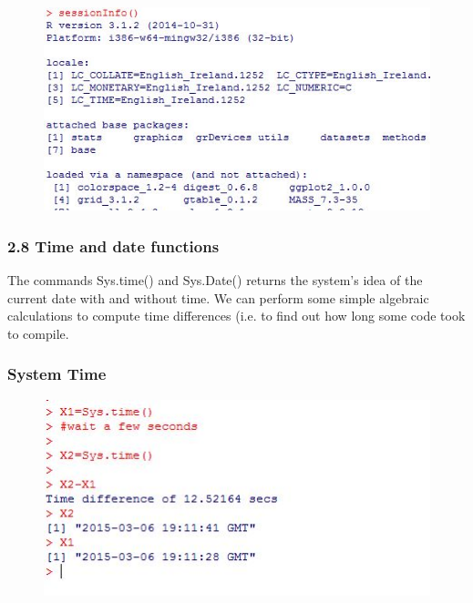 \documentclass{beamer}
\begin{document}
 	\begin{frame}
 		
 		\begin{figure}
 			\centering
 			\includegraphics[width=0.99\linewidth]{images/sessionInfo}
 		\end{figure}
 	\end{frame}	
 	\begin{frame}
 		\frametitle{2.8 Time and date functions}
 		The commands Sys.time() and Sys.Date() returns the system’s idea of the current date
 		with and without time. We can perform some simple algebraic calculations to compute time
 		differences (i.e. to find out how long some code took to compile.
 		
 	\end{frame}
 	\begin{frame}
 		\frametitle{System Time}
 		\begin{figure}
 			\centering
 			\includegraphics[width=1.2\linewidth]{images/Systime}
 		\end{figure}
 		
 	\end{frame}
\end{document}
